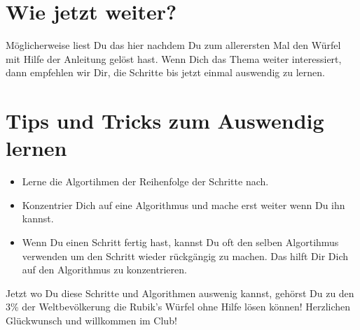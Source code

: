 \section{Wie jetzt weiter?}
Möglicherweise liest Du das hier nachdem Du zum allerersten Mal den Würfel
mit Hilfe der Anleitung gelöst hast. Wenn Dich das Thema weiter interessiert,
dann empfehlen wir Dir, die Schritte bis jetzt einmal auswendig zu lernen.

\section{Tips und Tricks zum Auswendig lernen}

\begin{itemize}
	\item Lerne die Algortihmen der Reihenfolge der Schritte nach.
	\item Konzentrier Dich auf eine Algorithmus und mache erst weiter
	      wenn Du ihn kannst.
	\item Wenn Du einen Schritt fertig hast, kannst Du oft den selben
	      Algortihmus verwenden um den Schritt wieder rückgängig zu
	      machen. Das hilft Dir Dich auf den Algorithmus zu konzentrieren.
\end{itemize}

Jetzt wo Du diese Schritte und Algorithmen auswenig kannst, gehörst Du zu den
3\% der Weltbevölkerung die Rubik's Würfel ohne Hilfe lösen können!
Herzlichen Glückwunsch und willkommen im Club!
